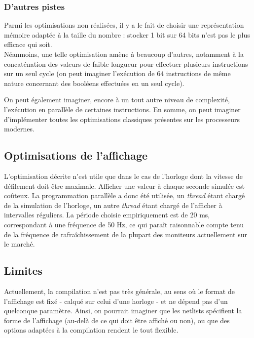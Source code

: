 \subsubsection{D'autres pistes}

Parmi les optimisations non réalisées, il y a le fait de choisir une représentation mémoire adaptée à la taille du nombre : stocker 1 bit sur 64 bits n'est pas le plus efficace qui soit. \\
Néanmoins, une telle optimisation amène à beaucoup d'autres, notamment à la concaténation des valeurs de faible longueur pour effectuer plusieurs instructions sur un seul cycle (on peut imaginer l'exécution de 64 instructions de même nature concernant des booléens effectuées en un seul cycle).


On peut également imaginer, encore à un tout autre niveau de complexité, l'exécution en parallèle de certaines instructions. En somme, on peut imaginer d'implémenter toutes les optimisations \og classiques \fg{} présentes sur les processeurs modernes.

\subsection{Optimisations de l'affichage}

L'optimisation décrite n'est utile que dans le cas de l'horloge dont la vitesse de défilement doit être maximale.
Afficher une valeur à chaque seconde simulée est coûteux.
La programmation parallèle a donc été utilisée, un \textit{thread} étant chargé de la simulation de l'horloge, un autre \textit{thread} étant chargé de l'afficher à intervalles réguliers. La période choisie empiriquement est de 20 ms, correspondant à une fréquence de 50 Hz, ce qui paraît raisonnable compte tenu de la fréquence de rafraîchissement de la plupart des moniteurs actuellement sur le marché.

\subsection{Limites}

Actuellement, la compilation n'est pas très générale, au sens où le format de l'affichage est fixé - calqué sur celui d'une horloge - et ne dépend pas d'un quelconque paramètre.
Ainsi, on pourrait imaginer que les netlists spécifient la forme de l'affichage (au-delà de ce qui doit être affiché ou non), ou que des options adaptées à la compilation rendent le tout flexible.
